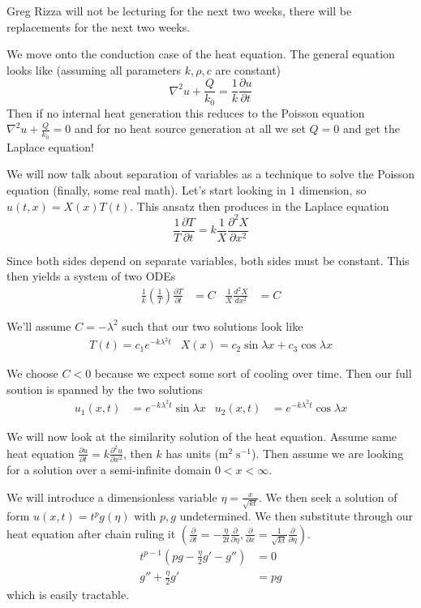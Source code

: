 \documentclass[10pt]{report}
\newcommand{\rtd}[2]{\frac{d^2#1}{d#2^2}}
\newcommand{\ptd}[2]{\frac{\partial^2 #1}{\partial#2^2}}
\newcommand{\pd}[2]{\frac{\partial #1}{\partial#2}}
\begin{document}
Greg Rizza will not be lecturing for the next two weeks, there will be replacements for the next two weeks.

We move onto the conduction case of the heat equation. The general equation looks like (assuming all parameters $k, \rho, c$ are constant)
\begin{equation}
    \nabla^2 u + \frac{Q}{k_0} = \frac{1}{k}\pd{u}{t}
\end{equation}
Then if no internal heat generation this reduces to the Poisson equation $\nabla^2 u + \frac{Q}{k_0} = 0$ and for no heat source generation at all we set $Q = 0$ and get the Laplace equation!

We will now talk about separation of variables as a technique to solve the Poisson equation (finally, some real math). Let's start looking in $1$ dimension, so $u(t,x) = X(x)T(t)$. This ansatz then produces in the Laplace equation
\begin{equation}
    \frac{1}{T}\pd{T}{t} = k\frac{1}{X}\ptd{X}{x}
\end{equation}

Since both sides depend on separate variables, both sides must be constant. This then yields a system of two ODEs
\begin{align}
    \frac{1}{k}\left( \frac{1}{T} \right)\pd{T}{t} &= C & \frac{1}{X}\rtd{X}{x} &= C
\end{align}

We'll assume $C = -\lambda^2$ such that our two solutions look like
\begin{align}
    T(t) = c_1e^{-k\lambda^2 t} & X(x) = c_2\sin \lambda x + c_3\cos \lambda x
\end{align}

We choose $C < 0$ because we expect some sort of cooling over time. Then our full soution is spanned by the two solutions
\begin{align}
    u_1(x,t) &= e^{-k\lambda^2 t}\sin \lambda x & u_2(x,t) &= e^{-k \lambda^2 t}\cos \lambda x
\end{align}

We will now look at the similarity solution of the heat equation. Assume same heat equation $\pd{u}{t} = k \ptd{u}{x}$, then $k$ has units ($\mathrm{m^2 \;s^{-1}}$). Then assume we are looking for a solution over a semi-infinite domain $0 < x < \infty$.

We will introduce a dimensionless variable $\eta = \frac{x}{\sqrt{kt}}$. We then seek a solution of form $u(x,t) = t^pg(\eta)$ with $p,g$ undetermined. We then substitute through our heat equation after chain ruling it $\left( \pd{}{t} = -\frac{\eta}{2t}\pd{}{\eta}, \pd{}{x} = \frac{1}{\sqrt{kt}}\pd{}{\eta} \right)$.
\begin{align}
    t^{p-1}\left( pg - \frac{\eta}{2}g' - g'' \right) &= 0\\
    g'' + \frac{\eta}{2}g' &= pg
\end{align}
which is easily tractable. 
\end{document}
